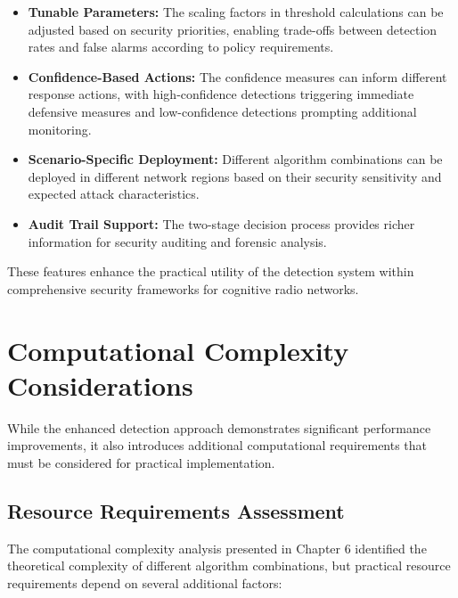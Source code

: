 \begin{itemize}
    \item \textbf{Tunable Parameters:} The scaling factors in threshold calculations can be adjusted based on security priorities, enabling trade-offs between detection rates and false alarms according to policy requirements.
    
    \item \textbf{Confidence-Based Actions:} The confidence measures can inform different response actions, with high-confidence detections triggering immediate defensive measures and low-confidence detections prompting additional monitoring.
    
    \item \textbf{Scenario-Specific Deployment:} Different algorithm combinations can be deployed in different network regions based on their security sensitivity and expected attack characteristics.
    
    \item \textbf{Audit Trail Support:} The two-stage decision process provides richer information for security auditing and forensic analysis.
\end{itemize}

These features enhance the practical utility of the detection system within comprehensive security frameworks for cognitive radio networks.

\section{Computational Complexity Considerations}

While the enhanced detection approach demonstrates significant performance improvements, it also introduces additional computational requirements that must be considered for practical implementation.

\subsection{Resource Requirements Assessment}

The computational complexity analysis presented in Chapter 6 identified the theoretical complexity of different algorithm combinations, but practical resource requirements depend on several additional factors:

